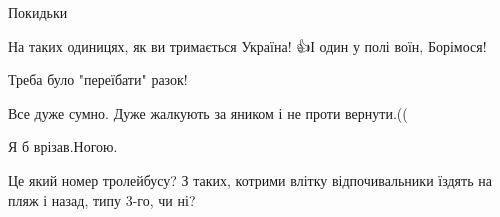 \begin{itemize}
\begin{itemize}
\end{itemize}

 
Покидьки

 
На таких одиницях, як ви тримається Україна! 👍І один у полі воїн, Борімося!

 
Треба було "переїбати" разок!

 
Все дуже сумно. Дуже жалкують за яником і не проти вернути.((

 
Я б врізав.Ногою.

 
Це який номер тролейбусу? З таких, котрими влітку відпочивальники їздять на пляж і назад, типу 3-го, чи ні?

\begin{itemize}
 

\end{itemize}
\end{itemize}
